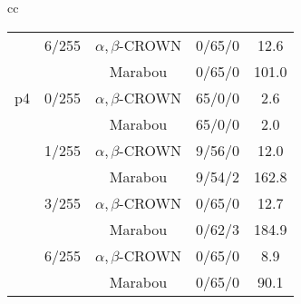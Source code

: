\begin{table*}[htbp]
\begin{tabular}{cc}
\begin{minipage}{0.48\linewidth}
\begin{tabular}{|c|c|c|c|c|}
\cline{2-5}
 & 6/255 & $\alpha, \beta$-CROWN & 0/65/0 & 12.6 \\
 &  & Marabou & 0/65/0 & 101.0 \\
\cline{2-5}
\hline
p4 & 0/255 & $\alpha, \beta$-CROWN & 65/0/0 & 2.6 \\
 &  & Marabou & 65/0/0 & 2.0 \\
\cline{2-5}
 & 1/255 & $\alpha, \beta$-CROWN & 9/56/0 & 12.0 \\
 &  & Marabou & 9/54/2 & 162.8 \\
\cline{2-5}
 & 3/255 & $\alpha, \beta$-CROWN & 0/65/0 & 12.7 \\
 &  & Marabou & 0/62/3 & 184.9 \\
\cline{2-5}
 & 6/255 & $\alpha, \beta$-CROWN & 0/65/0 & 8.9 \\
 &  & Marabou & 0/65/0 & 90.1 \\
\cline{2-5}
\hline
\end{tabular}


\end{minipage}
\end{tabular}
\end{table*}
